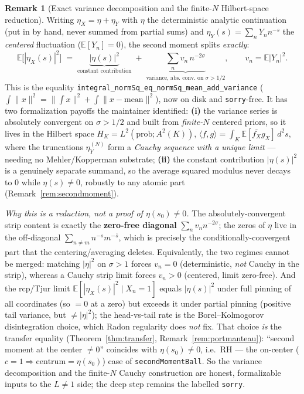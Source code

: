 \documentclass[11pt,a4paper]{article}
\theoremstyle{definition}
\newtheorem{remark}[theorem]{Remark}
\newcommand{\etaX}{\eta_X}
\newcommand{\etaY}{\eta_Y}
\begin{document}
\begin{remark}[Exact variance decomposition and the finite-\(N\) Hilbert-space reduction]\label{rem:variance}
Writing \(\etaX = \eta + \etaY\) with \(\eta\) the deterministic analytic continuation (put in by
hand, never summed from partial sums) and \(\etaY(s)=\sum_n Y_n n^{-s}\) the \emph{centered}
fluctuation (\(\mathbb{E}[Y_n]=0\)), the second moment splits \emph{exactly}:
\[
  \mathbb{E}\big[|\etaX(s)|^2\big]
  \;=\; \underbrace{|\eta(s)|^2}_{\text{constant contribution}}
  \;+\; \underbrace{\sum_n v_n\, n^{-2\sigma}}_{\text{variance, abs.\ conv.\ on }\sigma>1/2},
  \qquad v_n=\mathbb{E}|Y_n|^2 .
\]
This is the equality \texttt{integral\_normSq\_eq\_normSq\_mean\_add\_variance}
(\(\int\|x\|^2 = \|\!\int x\|^2 + \int\|x-\text{mean}\|^2\)), now on disk and \texttt{sorry}-free. It has
two formalization payoffs the maintainer identified: \textbf{(i)} the variance series is absolutely
convergent on \(\sigma>1/2\) and built from \emph{finite-\(N\)} centered priors, so it lives in the
Hilbert space \(H_K=L^2(\text{prob};A^2(K))\), \(\langle f,g\rangle=\int_K\mathbb{E}[\overline{f_X}g_X]\,d^2s\),
where the truncations \(\etaY^{(N)}\) form a \emph{Cauchy sequence with a unique limit} --- needing no
Mehler/Kopperman substrate; \textbf{(ii)} the constant contribution \(|\eta(s)|^2\) is a genuinely
separate summand, so the average squared modulus never decays to \(0\) while \(\eta(s)\neq0\), robustly
to any atomic part (Remark~\ref{rem:secondmoment}).

\emph{Why this is a reduction, not a proof of \(\eta(s_0)\neq0\).} The absolutely-convergent strip content
is exactly the \textbf{zero-free diagonal} \(\sum_n v_n n^{-2\sigma}\); the zeros of \(\eta\) live in the
off-diagonal \(\sum_{n\neq m} n^{-s}m^{-\overline s}\), which is precisely the conditionally-convergent
part that the centering/averaging deletes. Equivalently, the two regimes cannot be merged: matching
\(|\eta|^2\) on \(\sigma>1\) forces \(v_n=0\) (deterministic, \emph{not} Cauchy in the strip), whereas a
Cauchy strip limit forces \(v_n>0\) (centered, limit zero-free). And the rcp/Tjur limit
\(\mathbb{E}[|\etaX(s)|^2\mid X_n=1]\) equals \(|\eta(s)|^2\) under full pinning of all coordinates (so
\(=0\) at a zero) but exceeds it under partial pinning (positive tail variance, but \(\neq|\eta|^2\)); the
head-vs-tail rate is the Borel--Kolmogorov disintegration choice, which Radon regularity does \emph{not}
fix. That choice \emph{is} the transfer equality (Theorem~\ref{thm:transfer}, Remark~\ref{rem:portmanteau}):
``second moment at the center \(\neq0\)'' coincides with \(\eta(s_0)\neq0\), i.e.\ RH --- the on-center
(\(c=1\Rightarrow\text{centrum}=\eta(s_0)\)) case of \texttt{secondMomentBall}. So the variance decomposition
and the finite-\(N\) Cauchy construction are honest, formalizable inputs to the \(L\neq1\) side; the deep
step remains the labelled \texttt{sorry}.
\end{remark}
\end{document}
